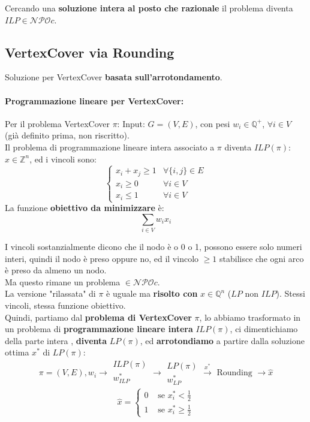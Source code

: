 \documentclass[11pt]{article}
\begin{document}
	Cercando una\textbf{ soluzione intera al posto che razionale} il problema diventa $ILP \in \mathcal{NPO}c$.\\
	
	\newpage
	
	\subsection{VertexCover via Rounding}
	Soluzione per VertexCover \textbf{basata sull'arrotondamento}.\\
	
	\paragraph{Programmazione lineare per VertexCover:} Per il problema VertexCover $\pi$: Input: $G = (V,E)$, con pesi $w_i \in \mathbb{Q}^+$, $\forall i \in V$ (già definito prima, non riscritto). \\
	
	Il problema di programmazione lineare intera associato a $\pi$ diventa $ILP(\pi)$: $x \in \mathbb{Z}^n$, ed i vincoli sono: 
	$$
	\begin{cases}
		x_i + x_j \geq 1 & \forall \{i,j\} \in E \\
		x_i \geq 0 & \forall i \in V \\
		x_i \leq 1 & \forall i \in V
	\end{cases}
	$$
	La funzione \textbf{obiettivo da minimizzare} è:
	$$ \sum_{i \in V} w_i x_i $$
	
	I vincoli sostanzialmente dicono che il nodo è o 0 o 1, possono essere solo numeri interi, quindi il nodo è preso oppure no, ed il vincolo $\geq 1$ stabilisce che ogni arco è preso da almeno un nodo. \\
	Ma questo rimane un problema $ \in \mathcal{NPO}c$.\\
	
	La versione "rilassata" di $\pi$ è uguale ma \textbf{risolto con} $x \in \mathbb{Q}^n$ ($LP$ non $ILP$). Stessi vincoli, stessa funzione obiettivo.\\
	
	Quindi, partiamo dal \textbf{problema di VertexCover} $\pi$, lo abbiamo trasformato in un problema di \textbf{programmazione lineare intera} $ILP(\pi)$, ci dimentichiamo della parte intera , \textbf{diventa} $LP(\pi)$, ed \textbf{arrotondiamo} a partire dalla soluzione ottima $x^\ast$ di $LP(\pi)$: 
	$$ \pi = (V,E), w_i  \xrightarrow[]{} 
	\begin{array}{c}
		ILP(\pi) \\
		w^\ast_{ILP} \\
	\end{array}
	\xrightarrow[]{}
	\begin{array}{c}
		LP(\pi) \\
		w^\ast_{LP}
	\end{array}
	\xrightarrow{x^\ast}
	\text{ Rounding }
	\xrightarrow{}
	\hat{x}
	$$
	$$ 
	\hat{x} = \begin{cases}
		0 & \text{ se } x^\ast_i <  \frac{1}{2} \\ 
		1 & \text{ se } x^\ast_i \geq  \frac{1}{2} 
	\end{cases}
	$$
	
\end{document}
